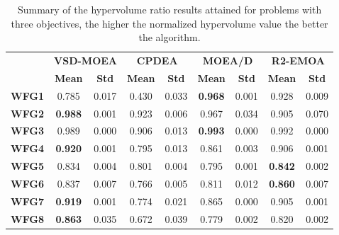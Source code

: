\begin{table*}[t]
\caption{Summary of the hypervolume ratio results attained for problems with three objectives, the higher the normalized hypervolume value the better the algorithm.}
\label{tab:StatisticsHV_3obj}
\begin{tabular}{c c|c|c|c|c|c|c|c}
\cline{2-9}
\textbf{}      & \multicolumn{2}{c|}{\textbf{VSD-MOEA}} & \multicolumn{2}{c|}{\textbf{CPDEA}} & \multicolumn{2}{c|}{\textbf{MOEA/D}} & \multicolumn{2}{c}{\textbf{R2-EMOA}} \\ \cline{2-9} 
\textbf{}      & \textbf{Mean}       & \textbf{Std}     & \textbf{Mean}     & \textbf{Std}    & \textbf{Mean}      & \textbf{Std}    & \textbf{Mean}      & \textbf{Std}     \\ \hline
\textbf{WFG1}  & 0.785               & 0.017            & 0.430             & 0.033           & \textbf{0.968}     & 0.001           & 0.928              & 0.009            \\ \hline
\textbf{WFG2}  & \textbf{0.988}      & 0.001            & 0.923             & 0.006           & 0.967              & 0.034           & 0.905              & 0.070            \\ \hline
\textbf{WFG3}  & 0.989               & 0.000            & 0.906             & 0.013           & \textbf{0.993}     & 0.000           & 0.992              & 0.000            \\ \hline
\textbf{WFG4}  & \textbf{0.920}      & 0.001            & 0.795             & 0.013           & 0.861              & 0.003           & 0.906              & 0.001            \\ \hline
\textbf{WFG5}  & 0.834               & 0.004            & 0.801             & 0.004           & 0.795              & 0.001           & \textbf{0.842}     & 0.002            \\ \hline
\textbf{WFG6}  & 0.837               & 0.007            & 0.766             & 0.005           & 0.811              & 0.012           & \textbf{0.860}     & 0.007            \\ \hline
\textbf{WFG7}  & \textbf{0.919}      & 0.001            & 0.774             & 0.021           & 0.865              & 0.000           & 0.905              & 0.001            \\ \hline
\textbf{WFG8}  & \textbf{0.863}      & 0.035            & 0.672             & 0.039           & 0.779              & 0.002           & 0.820              & 0.002            \\ \hline

\end{tabular}
\end{table*}
